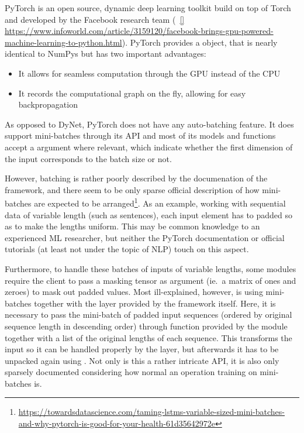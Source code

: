 PyTorch is an open source, dynamic deep learning toolkit build on top of Torch
and developed by the Facebook research team (~\ref{}
\url{https://www.infoworld.com/article/3159120/facebook-brings-gpu-powered-machine-learning-to-python.html}).
PyTorch provides a  object, that is nearly identical to NumPys
 but has two important advantages:

\begin{itemize}
    \item It allows for seamless computation through the GPU instead of the CPU
    \item It records the computational graph on the fly, allowing for easy
        backpropagation
\end{itemize}

As opposed to DyNet, PyTorch does not have any auto-batching feature. It does
support mini-batches through its API and most of its models and functions accept
a  argument where relevant, which indicate whether the first
dimension of the input corresponds to the batch size or not.

However, batching is rather poorly described by the documenation of the
framework, and there seem to be only sparse official description of how
mini-batches are expected to be arranged\footnote{\url{https://towardsdatascience.com/taming-lstms-variable-sized-mini-batches-and-why-pytorch-is-good-for-your-health-61d35642972e}}.
As an example, working with sequential data of variable length (such as
sentences), each input element has to padded so as to make the lengths uniform.
This may be common knowledge to an experienced ML researcher, but neither the
PyTorch documentation or official tutorials (at least not under the topic of
NLP) touch on this aspect.

Furthermore, to handle these batches of inputs of variable lengths, some modules
require the client to pass a masking tensor as argument (ie.\ a matrix of ones
and zeroes) to mask out padded values. Most ill-explained, however, is using
mini-batches together with the  layer provided by the framework
itself. Here, it is necessary to pass the mini-batch of padded input sequences
(ordered by original sequence length in descending order) through
 function provided by the 
module together with a list of the original lengths of each sequence. This
transforms the input so it can be handled properly by the  layer, but
afterwards it has to be unpacked again using . Not
only is this a rather intricate API, it is also only sparsely documented
considering how normal an operation training on mini-batches is.

